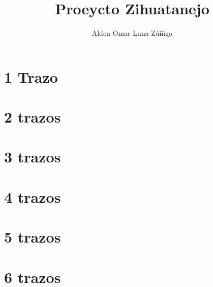 \documentclass[]{article}
\author{Alden Omar Luna Zúñiga}
\title{Proeycto Zihuatanejo}
\begin{document}
\begin{multicols}{4}
  \tableofcontents
\end{multicols}
\pagebreak
\section{1 Trazo}\label{1trazo} 
\begin{multicols}{2}

 \end{multicols}
 \section{2 trazos}\label{2trazos}\setcounter{subsection}{6}
 \begin{multicols}{2}
\end{multicols}
\section{3 trazos}\label{3trazos} \setcounter{subsection}{29} \begin{multicols}{2}

\end{multicols}

\section{4 trazos}\label{4trazos}\setcounter{subsection}{60}
\begin{multicols}{2}

\end{multicols}

\section{5 trazos}\label{5trazos}\setcounter{subsection}{94}
\begin{multicols}{2}

\end{multicols}

\section{6 trazos}\label{6trazos}\setcounter{subsection}{117}
\begin{multicols}{2}

\end{multicols}
\end{document}

